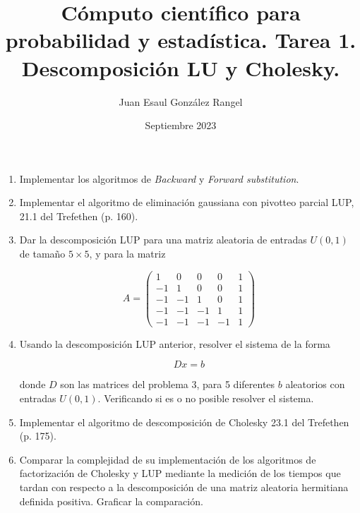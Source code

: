 \documentclass{article}
\title{Cómputo científico para probabilidad y estadística. Tarea 1.\\
Descomposición LU y Cholesky.}
\author{Juan Esaul González Rangel}
\date{Septiembre 2023}
\begin{document}
\maketitle


\begin{enumerate}

    \item Implementar los algoritmos de \textit{Backward} y \textit{Forward substitution}.

    \item Implementar el algoritmo de eliminación gaussiana con pivotteo parcial LUP, 21.1 del Trefethen (p. 160).

    \item Dar la descomposición LUP para una matriz aleatoria de entradas $U (0, 1)$ de tamaño $5 \times 5$, y para la matriz

    \begin{equation}
        A = \begin{pmatrix}
            1 & 0 & 0 & 0 & 1 \\
            -1 & 1 & 0 & 0 & 1 \\
            -1 & -1 & 1 & 0 & 1 \\
            -1 & -1 & -1 & 1 & 1 \\
            -1 & -1 & -1 & -1 & 1
        \end{pmatrix}
    \end{equation}

    \item Usando la descomposición LUP anterior, resolver el sistema de la forma

\begin{equation}
    Dx = b
\end{equation}

donde $D$ son las matrices del problema 3, para 5 diferentes $b$ aleatorios con entradas $U (0, 1)$. Verificando si es o no posible resolver el sistema.

    \item  Implementar el algoritmo de descomposición de Cholesky 23.1 del Trefethen (p. 175).

    \item Comparar la complejidad de su implementación de los algoritmos de
factorización de Cholesky y LUP mediante la medición de los tiempos
que tardan con respecto a la descomposición de una matriz aleatoria
hermitiana definida positiva. Graficar la comparación.

    \begin{figure*}
        
    \end{figure*}
   
\end{enumerate}




 
\end{document}
